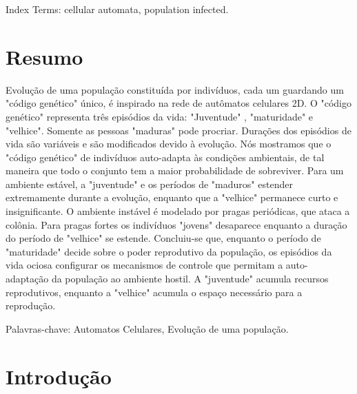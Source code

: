 \documentclass{article}
\begin{document}
Index Terms: cellular automata, population infected.


\section{Resumo}

Evolução de uma população constituída por indivíduos, cada um guardando um "código genético" único, é inspirado na rede de autômatos celulares 2D. O "código genético" representa três episódios da vida: "Juventude" , "maturidade" e "velhice". Somente as pessoas "maduras" pode procriar. Durações dos episódios de vida são variáveis e são modificados devido à evolução. Nós mostramos que o "código genético" de indivíduos auto-adapta às condições ambientais, de tal maneira que todo o conjunto tem a maior probabilidade de sobreviver. Para um ambiente estável, a "juventude" e os períodos de "maduros" estender extremamente durante a evolução, enquanto que a "velhice" permanece curto e insignificante. O ambiente instável é modelado por pragas periódicas, que ataca a colônia. Para pragas fortes os indivíduos "jovens" desaparece enquanto a duração do período de "velhice" se estende. Concluiu-se que, enquanto o período de "maturidade" decide sobre o poder reprodutivo da população, os episódios da vida ociosa configurar os mecanismos de controle que permitam a auto- adaptação da população ao ambiente hostil. A "juventude" acumula recursos reprodutivos, enquanto a "velhice" acumula o espaço necessário para a reprodução.

Palavras-chave: Automatos Celulares, Evolução de uma população.

\newpage


\section{Introdução}

\end{document}

